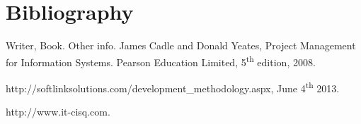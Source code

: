 \section*{Bibliography}

\begin{thebibliography}{9}
Writer,
Book. Other info.
James Cadle and Donald Yeates,
Project Management
for Information Systems. Pearson Education Limited, 5\textsuperscript{th} edition, 2008.

http://softlinksolutions.com/development\_methodology.aspx, June 4\textsuperscript{th} 2013.

http://www.it-cisq.com.
\end{thebibliography}
\newpage